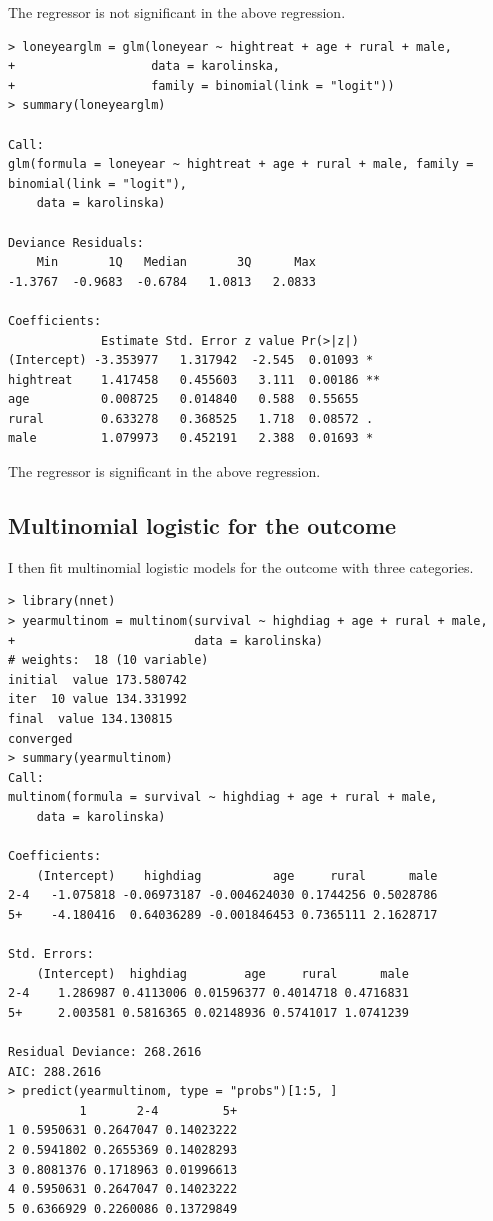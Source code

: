 The regressor  is not significant in the above regression. 


\begin{lstlisting}
> loneyearglm = glm(loneyear ~ hightreat + age + rural + male, 
+                   data = karolinska, 
+                   family = binomial(link = "logit"))
> summary(loneyearglm)

Call:
glm(formula = loneyear ~ hightreat + age + rural + male, family = binomial(link = "logit"), 
    data = karolinska)

Deviance Residuals: 
    Min       1Q   Median       3Q      Max  
-1.3767  -0.9683  -0.6784   1.0813   2.0833  

Coefficients:
             Estimate Std. Error z value Pr(>|z|)   
(Intercept) -3.353977   1.317942  -2.545  0.01093 * 
hightreat    1.417458   0.455603   3.111  0.00186 **
age          0.008725   0.014840   0.588  0.55655   
rural        0.633278   0.368525   1.718  0.08572 . 
male         1.079973   0.452191   2.388  0.01693 * 
\end{lstlisting} 


The regressor  is significant in the above regression. 


\subsection{Multinomial logistic for the outcome}

I then fit multinomial logistic models for the outcome with three categories. 

\begin{lstlisting}
> library(nnet)
> yearmultinom = multinom(survival ~ highdiag + age + rural + male,
+                         data = karolinska)
# weights:  18 (10 variable)
initial  value 173.580742 
iter  10 value 134.331992
final  value 134.130815 
converged
> summary(yearmultinom)
Call:
multinom(formula = survival ~ highdiag + age + rural + male, 
    data = karolinska)

Coefficients:
    (Intercept)    highdiag          age     rural      male
2-4   -1.075818 -0.06973187 -0.004624030 0.1744256 0.5028786
5+    -4.180416  0.64036289 -0.001846453 0.7365111 2.1628717

Std. Errors:
    (Intercept)  highdiag        age     rural      male
2-4    1.286987 0.4113006 0.01596377 0.4014718 0.4716831
5+     2.003581 0.5816365 0.02148936 0.5741017 1.0741239

Residual Deviance: 268.2616 
AIC: 288.2616 
> predict(yearmultinom, type = "probs")[1:5, ]
          1       2-4         5+
1 0.5950631 0.2647047 0.14023222
2 0.5941802 0.2655369 0.14028293
3 0.8081376 0.1718963 0.01996613
4 0.5950631 0.2647047 0.14023222
5 0.6366929 0.2260086 0.13729849
\end{lstlisting}

